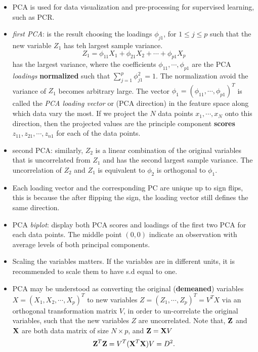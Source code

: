 \documentclass[
  letterpaper,
  DIV=11,
  numbers=noendperiod]{scrreprt}
\begin{document}
\begin{itemize}
\item
  PCA is used for data visualization and pre-processing for supervised
  learning, such as PCR.
\item
  \emph{first PCA}: is the result choosing the loadings \(\phi_{j1}\),
  for \(1\le j \le p\) such that the new variable \(Z_1\) has teh
  largest sample variance. \[
  Z_1 =\phi_{11}X_1 +\phi_{21}X_2+\cdots +\phi_{p1}X_p
  \] has the largest variance, where the coefficients
  \(\phi_{11}, \cdots, \phi_{p1}\) are the PCA \emph{loadings}
  \textbf{normalized} such that \(\sum_{j=1}^p \phi_{j1}^2=1\). The
  normalization avoid the variance of \(Z_1\) becomes arbitrary large.
  The vector \(\phi_1=(\phi_{11}, \cdots, \phi_{p1})^T\) is called the
  \emph{PCA loading vector} or (PCA direction) in the feature space
  along which data vary the most. If we project the \(N\) data points
  \(x_1, \cdots, x_N\) onto this direction, then the projected values
  are the principle component \textbf{scores}
  \(z_{11} , z_{21}, \cdots, z_{n1}\) for each of the data points.
\item
  second PCA: similarly, \(Z_2\) is a linear combination of the original
  variables that is uncorrelated from \(Z_1\) and has the second largest
  sample variance. The uncorrelation of \(Z_2\) and \(Z_1\) is
  equivalent to \(\phi_2\) is orthogonal to \(\phi_1\).
\item
  Each loading vector and the corresponding PC are unique up to sign
  flips, this is because the after flipping the sign, the loading vector
  still defines the same direction.
\item
  PCA \emph{biplot}: display both PCA scores and loadings of the first
  two PCA for each data points. The middle point \((0,0)\) indicate an
  observation with average levels of both principal components.
\item
  Scaling the variables matters. If the variables are in different
  units, it is recommended to scale them to have s.d equal to one.
\item
  PCA may be understood as converting the original (\textbf{demeaned})
  variables \(X=(X_1, X_2, \cdots, X_p)^T\) to new variables
  \(Z=(Z_1, \cdots, Z_p)^T=V^TX\) via an orthogonal transformation
  matrix \(V\), in order to un-correlate the original variables, such
  that the new variables \(Z\) are uncorrelated. Note that, \({\bf Z}\)
  and \({\bf X}\) are both data matrix of size \(N\times p\), and
  \({\bf Z}={\bf X}V\) \[
  {\bf Z}^T{\bf Z} = V^T({\bf X}^T{\bf X})V= D^2. 
\]
\end{itemize}
\end{document}
